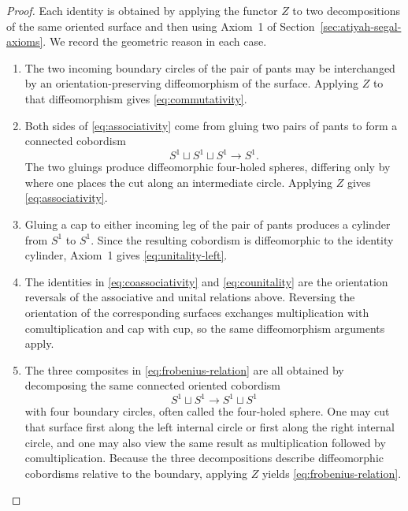 \begin{proof}
Each identity is obtained by applying the functor $Z$ to two decompositions of the same oriented surface and then using Axiom~1 of Section~\ref{sec:atiyah-segal-axioms}. We record the geometric reason in each case.

\begin{enumerate}
\item The two incoming boundary circles of the pair of pants may be interchanged by an orientation-preserving diffeomorphism of the surface. Applying $Z$ to that diffeomorphism gives \eqref{eq:commutativity}.

\item Both sides of \eqref{eq:associativity} come from gluing two pairs of pants to form a connected cobordism
\begin{equation*}
S^1 \sqcup S^1 \sqcup S^1 \longrightarrow S^1.
\end{equation*}
The two gluings produce diffeomorphic four-holed spheres, differing only by where one places the cut along an intermediate circle. Applying $Z$ gives \eqref{eq:associativity}.

\item Gluing a cap to either incoming leg of the pair of pants produces a cylinder from $S^1$ to $S^1$. Since the resulting cobordism is diffeomorphic to the identity cylinder, Axiom~1 gives \eqref{eq:unitality-left}.

\item The identities in \eqref{eq:coassociativity} and \eqref{eq:counitality} are the orientation reversals of the associative and unital relations above. Reversing the orientation of the corresponding surfaces exchanges multiplication with comultiplication and cap with cup, so the same diffeomorphism arguments apply.

\item The three composites in \eqref{eq:frobenius-relation} are all obtained by decomposing the same connected oriented cobordism
\begin{equation*}
S^1 \sqcup S^1 \longrightarrow S^1 \sqcup S^1
\end{equation*}
with four boundary circles, often called the four-holed sphere. One may cut that surface first along the left internal circle or first along the right internal circle, and one may also view the same result as multiplication followed by comultiplication. Because the three decompositions describe diffeomorphic cobordisms relative to the boundary, applying $Z$ yields \eqref{eq:frobenius-relation}.
\end{enumerate}
\end{proof}

